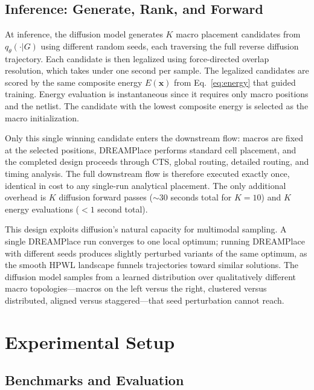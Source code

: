 \documentclass[sigconf,anonymous,review,9pt]{acmart}
\begin{document}
\subsection{Inference: Generate, Rank, and Forward}
\label{subsec:pipeline}

At inference, the diffusion model generates $K$ macro placement
candidates from $q_\theta(\cdot | G)$ using different random seeds, each
traversing the full reverse diffusion trajectory. Each candidate is then
legalized using force-directed overlap resolution, which takes under one
second per sample. The legalized candidates are scored by the same
composite energy $E(\mathbf{x})$ from Eq.~\eqref{eq:energy} that guided
training. Energy evaluation is instantaneous since it requires only
macro positions and the netlist. The candidate with the lowest composite
energy is selected as the macro initialization.

Only this single winning candidate enters the downstream flow: macros
are fixed at the selected positions, DREAMPlace performs standard cell
placement, and the completed design proceeds through CTS, global
routing, detailed routing, and timing analysis. The full downstream flow
is therefore executed exactly once, identical in cost to any single-run
analytical placement. The only additional overhead is $K$ diffusion
forward passes (${\sim}$30 seconds total for $K = 10$) and $K$ energy
evaluations ($< 1$ second total).

This design exploits diffusion's natural capacity for multimodal
sampling. A single DREAMPlace run converges to one local optimum;
running DREAMPlace with different seeds produces slightly perturbed
variants of the same optimum, as the smooth HPWL landscape funnels
trajectories toward similar solutions. The diffusion model samples from
a learned distribution over qualitatively different macro
topologies---macros on the left versus the right, clustered versus
distributed, aligned versus staggered---that seed perturbation cannot
reach.


\section{Experimental Setup}
\label{sec:setup}

\subsection{Benchmarks and Evaluation}
\end{document}
